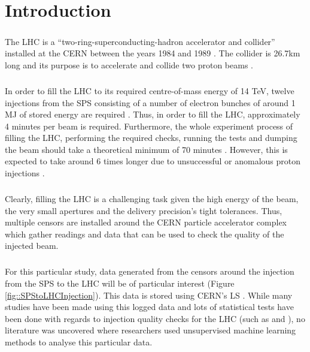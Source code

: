 \chapter{Introduction}

\paragraph{ }The \ac{LHC} is a ``two-ring-superconducting-hadron accelerator and collider'' installed at the \ac{CERN} between the years 1984 and 1989 \cite{Evans2008}. The collider is 26.7km long and its purpose is to accelerate and collide two proton beams \cite{Valentino2017}.

\paragraph{ }In order to fill the \acs{LHC} to its required centre-of-mass energy of 14 \ac{TeV}, twelve injections from the \ac{SPS} consisting of a number of electron bunches of around 1 \ac{MJ} of stored energy are required \cite{Drosdal2011}. Thus, in order to fill the \acs{LHC}, approximately 4 minutes per beam is required. Furthermore, the whole experiment process of filling the LHC, performing the required checks, running the tests and dumping the beam should take a theoretical minimum of 70 minutes \cite{Evans2008}. However, this is expected to take around 6 times longer due to unsuccessful or anomalous proton injections \cite{Evans2008}. 

\paragraph{ }Clearly, filling the \acs{LHC} is a challenging task given the high energy of the beam, the very small apertures and the delivery precision's tight tolerances. Thus, multiple censors are installed around the \acs{CERN} particle accelerator complex \cite{Lefevre2008} which gather readings and data that can be used to check the quality of the injected beam. 

\paragraph{ }  For this particular study, data generated from the censors around the injection from the \acs{SPS} to the \acs{LHC} will be of particular interest (Figure \ref{fig::SPStoLHCInjection}). This data is stored using \acs{CERN}'s \ac{LS} \cite{Roderick2013}. While many studies have been made using this logged data and lots of statistical tests have been done with regards to injection quality checks for the \acs{LHC} (such as \cite{Drosdal2011} and \cite{Kain2010}), no literature was uncovered where researchers used unsupervised machine learning methods to analyse this particular data.

